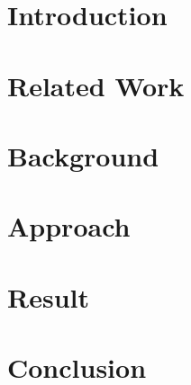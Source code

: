 \documentclass[conference,a4paper]{IEEEtran}
\begin{document}


\section{Introduction}
%


\IEEEpubidadjcol
\section{Related Work}\label{Related Work}
%



\section{Background}\label{Background}
%



\section{Approach}\label{Approach}
%



\section{Result}\label{Result}
%



\section{Conclusion}\label{Conclusion}
%





%



\end{document}
